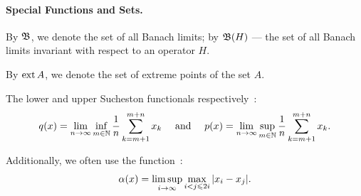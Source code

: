 \paragraph{Special Functions and Sets.}

By \(\B\), we denote the set of all Banach limits;
by \(\B(H)\) — the set of all Banach limits invariant with respect to an operator \(H\).

By \(\ext A\), we denote the set of extreme points of the set \(A\).

The lower and upper Sucheston functionals respectively~\cite{sucheston1967banach}:
\begin{equation*}
	q(x) = \lim_{n\to\infty} \inf_{m\in\N}  \frac{1}{n} \sum_{k=m+1}^{m+n} x_k
	~~~~\mbox{and}~~~~
	p(x) = \lim_{n\to\infty} \sup_{m\in\N}  \frac{1}{n} \sum_{k=m+1}^{m+n} x_k
	.
\end{equation*}

Additionally, we often use the function~:
\begin{equation}
	\alpha(x) = \varlimsup_{i\to\infty} \max_{i<j\leqslant 2i} |x_i - x_j|
	.
\end{equation}
